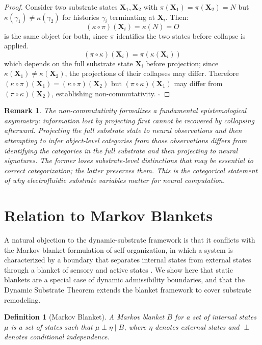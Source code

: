 \documentclass[12pt,a4paper]{article}
\newtheorem{definition}[theorem]{Definition}
\newtheorem{remark}[theorem]{Remark}
\begin{document}
\begin{proof}
Consider two substrate states $\mathbf{X}_1, \mathbf{X}_2$ with $\pi(\mathbf{X}_1) = \pi(\mathbf{X}_2) = N$ but $\kappa(\gamma_1) \neq \kappa(\gamma_2)$ for histories $\gamma_i$ terminating at $\mathbf{X}_i$. Then:
\[
(\kappa \circ \pi)(\mathbf{X}_i) = \kappa(N) = O
\]
is the same object for both, since $\pi$ identifies the two states before collapse is applied.
\[
(\pi \circ \kappa)(\mathbf{X}_i) = \pi(\kappa(\mathbf{X}_i))
\]
which depends on the full substrate state $\mathbf{X}_i$ before projection; since $\kappa(\mathbf{X}_1) \neq \kappa(\mathbf{X}_2)$, the projections of their collapses may differ. Therefore $(\kappa\circ\pi)(\mathbf{X}_1) = (\kappa\circ\pi)(\mathbf{X}_2)$ but $(\pi\circ\kappa)(\mathbf{X}_1)$ may differ from $(\pi\circ\kappa)(\mathbf{X}_2)$, establishing non-commutativity. $\square$
\end{proof}

\begin{remark}
The non-commutativity formalizes a fundamental epistemological asymmetry: information lost by projecting first cannot be recovered by collapsing afterward. Projecting the full substrate state to neural observations and then attempting to infer object-level categories from those observations differs from identifying the categories in the full substrate and then projecting to neural signatures. The former loses substrate-level distinctions that may be essential to correct categorization; the latter preserves them. This is the categorical statement of why electrofluidic substrate variables matter for neural computation.
\end{remark}

\section{Relation to Markov Blankets}
\label{app:markov}

A natural objection to the dynamic-substrate framework is that it conflicts with the Markov blanket formulation of self-organization, in which a system is characterized by a boundary that separates internal states from external states through a blanket of sensory and active states \cite{friston2019}. We show here that static blankets are a special case of dynamic admissibility boundaries, and that the Dynamic Substrate Theorem extends the blanket framework to cover substrate remodeling.

\begin{definition}[Markov Blanket]
A \emph{Markov blanket} $B$ for a set of internal states $\mu$ is a set of states such that $\mu \perp \eta \mid B$, where $\eta$ denotes external states and $\perp$ denotes conditional independence.
\end{definition}
\end{document}
